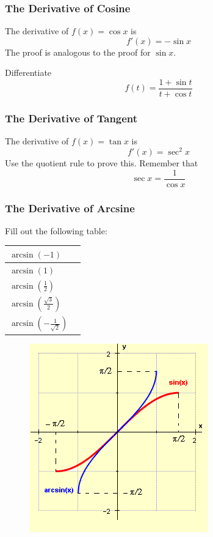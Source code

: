 \documentclass[xcolor=dvipsnames]{beamer}
\begin{document}
\begin{frame}
  \frametitle{The Derivative of Cosine}
The derivative of $f(x)=\cos{}x$ is 
\begin{equation}
  \label{eq:ahfiefev}
  f'(x)=-\sin{}x
\end{equation}
The proof is analogous to the proof for $\sin{}x$.

{\ubung} Differentiate 
\begin{equation}
  \label{eq:afeizeix}
  f(t)=\frac{1+\sin{}t}{t+\cos{}t}
\end{equation}
\end{frame}

\begin{frame}
  \frametitle{The Derivative of Tangent}
The derivative of $f(x)=\tan{}x$ is 
\begin{equation}
  \label{eq:uulohjeo}
  f'(x)=\sec^{2}x
\end{equation}
Use the quotient rule to prove this. Remember that 
\begin{equation}
  \label{eq:shooceid}
  \sec{}x=\frac{1}{\cos{}x}
\end{equation}
\end{frame}

\begin{frame}
  \frametitle{The Derivative of Arcsine}
  {\ubung} Fill out the following table:

  \begin{tabular}{|l|l|}\hline
    $\arcsin(-1)$ & \\ \hline
    $\arcsin(1)$ & \\ \hline
    $\arcsin\left(\frac{1}{2}\right)$ & \\ \hline
    $\arcsin\left(\frac{\sqrt{3}}{2}\right)$ & \\ \hline
    $\arcsin\left(-\frac{1}{\sqrt{2}}\right)$ & \\ \hline
  \end{tabular}
\begin{figure}[h]
\includegraphics[scale=.4]{./diagrams/arcsin.png}
\end{figure}
\end{frame}
\end{document}
